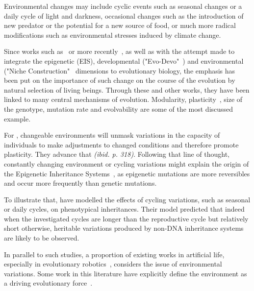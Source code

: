 
Environmental changes may include cyclic events such as seasonal changes or a daily cycle of light and darkness, occasional changes such as the introduction of new predator or the potential for a new source of food, or much more radical modifications such as environmental stresses induced by climate change.

Since works such as~\citep{levins1968evolution} or more recently~\citep{jablonka2014evolution}, as well as with the attempt made to integrate the epigenetic (EIS), developmental ("Evo-Devo"~\citep{muller2007evodevoextendingtheevolutionarysynthesis}) and environmental ("Niche Construction"~\citep{laland2016anintroductiontonicheconstructiontheory} dimensions to evolutionary biology, the emphasis has been put on the importance of such change on the course of the evolution by natural selection of living beings. Through these and other works, they have been linked to many central mechanisms of evolution. Modularity, plasticity~\citep{west2005developmental}, size of the genotype, mutation rate and evolvability are some of the most discussed example. 

For \cite{jablonka2014evolution}, changeable environments will unmask variations in the capacity of individuals to make adjustments to changed conditions and therefore promote plasticity. They advance that \emph{(ibid. p. 318)}. Following that line of thought, constantly changing environment or cycling variations might explain the origin of the Epigenetic Inheritance Systems~\citep{heard2014transgenerationalepigeneticinheritancemythsandmechanisms}, as epigenetic mutations are more reversibles and occur more frequently than genetic mutations. 

To illustrate that, \cite{lachmann1996inheritance} have modelled the effects of cycling variations, such as seasonal or daily cycles, on phenotypical inheritances. Their model predicted that indeed when the investigated cycles are longer than the reproductive cycle but relatively short otherwise, heritable variations produced by non-DNA inheritance systems are likely to be observed. 

In parallel to such studies, a proportion of existing works in artificial life, especially in evolutionary robotics~\citep{floreano2000evolutionary}, considers the issue of environmental variations. Some work in this literature have explicitly define the environment as a driving evolutionary force~\citep{bredeche2012environmentdrivenopenende}. %

